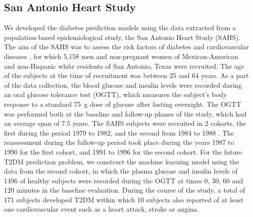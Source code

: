 \documentclass[journal,comsoc]{IEEEtran}
\begin{document}
\subsection{San Antonio Heart Study}
%
We developed the diabetes prediction models using the data extracted from a population-based epidemiological study, the San Antonio Heart Study (SAHS). The aim of the SAHS was to assess the risk factors of diabetes and cardiovascular diseases \cite{burke_rapid_1999, lorenzo_trend_2006}, for which  5,158 men and non-pregnant women of Mexican-American and non-Hispanic white residents of San Antonio, Texas were recruited. The age of the subjects at the time of recruitment was between \num{25} and \num{64} years. As a part of the data collection, the blood glucose and insulin levels were recorded during an oral glucose tolerance test (OGTT), which measures the subject's body response to a standard \SI{75}{\gram} dose of glucose after fasting overnight. The OGTT was performed both at the baseline and follow-up phases of the study, which had an average span of \num{7.5} years. The SAHS subjects were recruited in \num{2} cohorts, the first during the period \num{1979} to \num{1982}, and the second from \num{1984} to \num{1988} \cite{haffner_hyperinsulinemia_1986}. The reassessment during the follow-up period took place during the years \num{1987} to \num{1990} for the first cohort, and \num{1991} to \num{1996} for the second cohort. For the future T2DM prediction problem, we construct the machine learning model using the data from the second cohort, in which the plasma glucose and insulin levels of \num[round-mode = off,group-separator = {,}]{1496} of healthy subjects were recorded during the OGTT at times \num{0}, \num{30}, \num{60} and \num{120} minutes in the baseline evaluation. During the course of the study, a total of 171 subjects developed T2DM within which 10 subjects also reported of at least one cardiovascular event such as a heart attack, stroke or angina.
\end{document}
